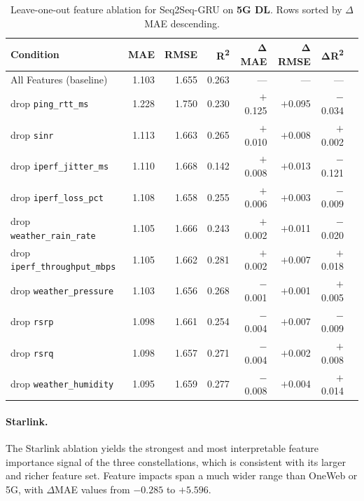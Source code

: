 \documentclass[12pt]{article}
\begin{document}
\begin{table}[ht]
\centering
\caption{Leave-one-out feature ablation for Seq2Seq-GRU on \textbf{5G DL}.
Rows sorted by $\Delta$MAE descending.}
\label{tab:ablation_5g}
\setlength{\tabcolsep}{5pt}
\renewcommand{\arraystretch}{1.12}
\small
\begin{tabular}{lrrrrrrr}
\toprule
\textbf{Condition} & \textbf{MAE} & \textbf{RMSE} & \textbf{R\textsuperscript{2}}
  & $\boldsymbol{\Delta}$\textbf{MAE} & $\boldsymbol{\Delta}$\textbf{RMSE} & $\boldsymbol{\Delta}$\textbf{R\textsuperscript{2}} \\
\midrule
All Features (baseline) & 1.103 & 1.655 & 0.263 & --- & --- & --- \\
\midrule
drop \texttt{ping\_rtt\_ms}          & 1.228 & 1.750 & 0.230 & $+$0.125 & $+$0.095 & $-$0.034 \\
drop \texttt{sinr}                   & 1.113 & 1.663 & 0.265 & $+$0.010 & $+$0.008 & $+$0.002 \\
drop \texttt{iperf\_jitter\_ms}      & 1.110 & 1.668 & 0.142 & $+$0.008 & $+$0.013 & $-$0.121 \\
drop \texttt{iperf\_loss\_pct}       & 1.108 & 1.658 & 0.255 & $+$0.006 & $+$0.003 & $-$0.009 \\
drop \texttt{weather\_rain\_rate}    & 1.105 & 1.666 & 0.243 & $+$0.002 & $+$0.011 & $-$0.020 \\
drop \texttt{iperf\_throughput\_mbps}& 1.105 & 1.662 & 0.281 & $+$0.002 & $+$0.007 & $+$0.018 \\
drop \texttt{weather\_pressure}      & 1.103 & 1.656 & 0.268 & $-$0.001 & $+$0.001 & $+$0.005 \\
drop \texttt{rsrp}                   & 1.098 & 1.661 & 0.254 & $-$0.004 & $+$0.007 & $-$0.009 \\
drop \texttt{rsrq}                   & 1.098 & 1.657 & 0.271 & $-$0.004 & $+$0.002 & $+$0.008 \\
drop \texttt{weather\_humidity}      & 1.095 & 1.659 & 0.277 & $-$0.008 & $+$0.004 & $+$0.014 \\
\bottomrule
\end{tabular}
\end{table}

\paragraph{Starlink.}
The Starlink ablation yields the strongest and most interpretable feature importance signal of the three constellations, which is consistent with its larger and richer feature set. Feature impacts span a much wider range than OneWeb or 5G, with $\Delta$MAE values from $-0.285$ to $+5.596$.
\end{document}
